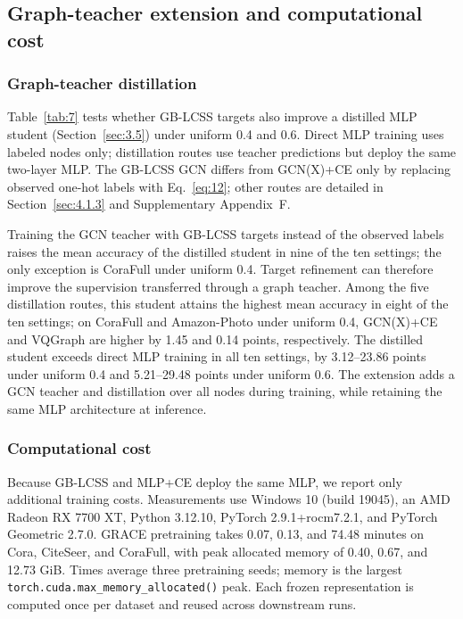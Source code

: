 \documentclass[times,review,10pt]{elsarticle}
\theoremstyle{definition}
\theoremstyle{plain}
\begin{document}
\subsection{Graph-teacher extension and computational cost}\label{sec:4.4}

\subsubsection{Graph-teacher distillation}\label{sec:4.4.1}

Table~\ref{tab:7} tests whether GB-LCSS targets also improve a distilled MLP student (Section~\ref{sec:3.5}) under uniform 0.4 and 0.6. Direct MLP training uses labeled nodes only; distillation routes use teacher predictions but deploy the same two-layer MLP. The GB-LCSS GCN differs from GCN(X)+CE only by replacing observed one-hot labels with Eq.~\eqref{eq:12}; other routes are detailed in Section~\ref{sec:4.1.3} and Supplementary Appendix~F.

\begin{table}[!t]
\centering
\caption{Test accuracy of deployed MLPs under direct training and graph-to-MLP distillation.}\label{tab:7}

\end{table}

Training the GCN teacher with GB-LCSS targets instead of the observed labels raises the mean accuracy of the distilled student in nine of the ten settings; the only exception is CoraFull under uniform 0.4. Target refinement can therefore improve the supervision transferred through a graph teacher. Among the five distillation routes, this student attains the highest mean accuracy in eight of the ten settings; on CoraFull and Amazon-Photo under uniform 0.4, GCN(X)+CE and VQGraph are higher by 1.45 and 0.14 points, respectively. The distilled student exceeds direct MLP training in all ten settings, by 3.12--23.86 points under uniform 0.4 and 5.21--29.48 points under uniform 0.6. The extension adds a GCN teacher and distillation over all nodes during training, while retaining the same MLP architecture at inference.
\subsubsection{Computational cost}\label{sec:4.4.2}

Because GB-LCSS and MLP+CE deploy the same MLP, we report only additional training costs. Measurements use Windows 10 (build 19045), an AMD Radeon RX 7700 XT, Python 3.12.10, PyTorch 2.9.1+rocm7.2.1, and PyTorch Geometric 2.7.0. GRACE pretraining takes 0.07, 0.13, and 74.48 minutes on Cora, CiteSeer, and CoraFull, with peak allocated memory of 0.40, 0.67, and 12.73 GiB. Times average three pretraining seeds; memory is the largest \texttt{torch.cuda.max\_memory\_allocated()} peak. Each frozen representation is computed once per dataset and reused across downstream runs.
\end{document}
